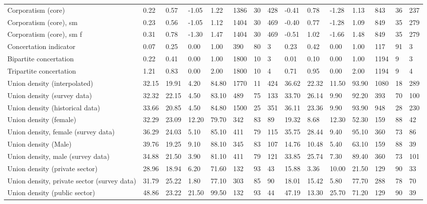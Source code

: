 \begin{longtable}{lllllllllllllll}
Corporatism (core) & 0.22 & 0.57 & -1.05 & 1.22 & 1386 & 30 & 428 & -0.41 & 0.78 & -1.28 & 1.13 & 843 & 36 & 237\\
\addlinespace
Corporatism (core), sm & 0.23 & 0.56 & -1.05 & 1.12 & 1404 & 30 & 469 & -0.40 & 0.77 & -1.28 & 1.09 & 849 & 35 & 279\\
Corporatism (core), sm f & 0.31 & 0.78 & -1.30 & 1.47 & 1404 & 30 & 469 & -0.51 & 1.02 & -1.66 & 1.48 & 849 & 35 & 279\\
Concertation indicator & 0.07 & 0.25 & 0.00 & 1.00 & 390 & 80 & 3 & 0.23 & 0.42 & 0.00 & 1.00 & 117 & 91 & 3\\
Bipartite concertation & 0.22 & 0.41 & 0.00 & 1.00 & 1800 & 10 & 3 & 0.01 & 0.10 & 0.00 & 1.00 & 1194 & 9 & 3\\
Tripartite concertation & 1.21 & 0.83 & 0.00 & 2.00 & 1800 & 10 & 4 & 0.71 & 0.95 & 0.00 & 2.00 & 1194 & 9 & 4\\
\addlinespace
Union density (interpolated) & 32.15 & 19.91 & 4.20 & 84.80 & 1770 & 11 & 424 & 36.62 & 22.32 & 11.50 & 93.90 & 1080 & 18 & 289\\
Union density (survey data) & 32.32 & 22.15 & 4.50 & 83.10 & 489 & 75 & 133 & 33.70 & 26.14 & 9.90 & 92.20 & 393 & 70 & 100\\
Union density (historical data) & 33.66 & 20.85 & 4.50 & 84.80 & 1500 & 25 & 351 & 36.11 & 23.36 & 9.90 & 93.90 & 948 & 28 & 230\\
Union density (female) & 32.29 & 23.09 & 12.20 & 79.70 & 342 & 83 & 89 & 19.32 & 8.68 & 12.30 & 52.30 & 159 & 88 & 42\\
Union density, female (survey data) & 36.29 & 24.03 & 5.10 & 85.10 & 411 & 79 & 115 & 35.75 & 28.44 & 9.40 & 95.10 & 360 & 73 & 86\\
\addlinespace
Union density (Male) & 39.76 & 19.25 & 9.10 & 88.10 & 345 & 83 & 107 & 14.76 & 10.48 & 5.40 & 63.10 & 159 & 88 & 39\\
Union density, male (survey data) & 34.88 & 21.50 & 3.90 & 81.10 & 411 & 79 & 121 & 33.85 & 25.74 & 7.30 & 89.40 & 360 & 73 & 101\\
Union density (private sector) & 28.96 & 18.94 & 6.20 & 71.60 & 132 & 93 & 43 & 15.88 & 3.36 & 10.00 & 21.50 & 129 & 90 & 33\\
Union density, private sector (survey data) & 31.79 & 25.22 & 1.80 & 77.10 & 303 & 85 & 90 & 18.01 & 15.42 & 5.80 & 77.70 & 288 & 78 & 70\\
Union density (public sector) & 48.86 & 23.22 & 21.50 & 99.50 & 132 & 93 & 44 & 47.19 & 13.30 & 25.70 & 71.20 & 129 & 90 & 39\\

\end{longtable}

